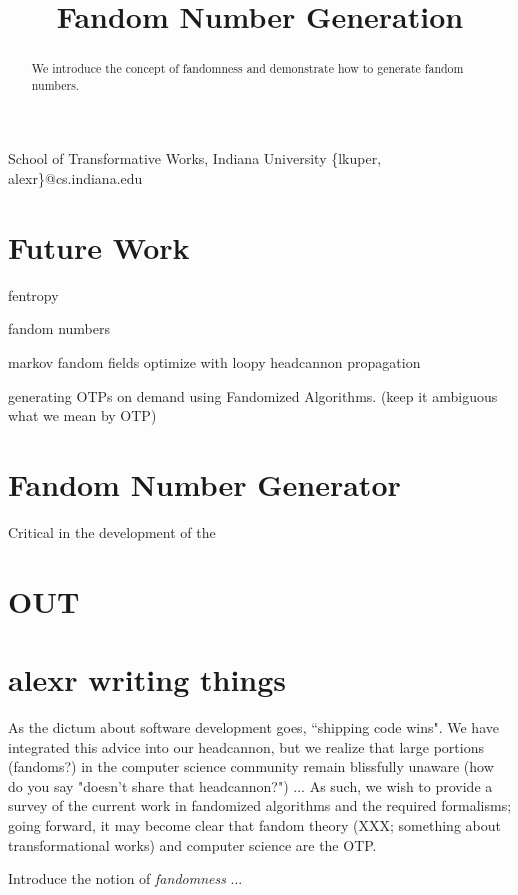 \documentclass[9pt]{sigplanconf}
\begin{document}
\title{Fandom Number Generation}

           {School of Transformative Works, Indiana University}
           {\{lkuper, alexr\}@cs.indiana.edu}

\maketitle

\begin{abstract}
We introduce the concept of fandomness and demonstrate how to generate
fandom numbers.

\end{abstract}

\section{Future Work}

fentropy

fandom numbers

markov fandom fields
optimize with loopy headcannon propagation

generating OTPs on demand using Fandomized Algorithms. (keep it ambiguous what
we mean by OTP)

\section{Fandom Number Generator}
Critical in the development of the 

\section{OUT}

\section{alexr writing things}
As the dictum about software development goes, ``shipping code wins". We have
integrated this advice into our headcannon, but we realize that large portions
(fandoms?) in the computer science community remain blissfully unaware (how do
you say "doesn't share that headcannon?") ...
As such, we wish to provide a survey of the current work in fandomized
algorithms and the required formalisms; going forward, it may become clear that
fandom theory (XXX; something about transformational works) and computer
science are the OTP.

Introduce the notion of \emph{fandomness} ...
\end{document}
